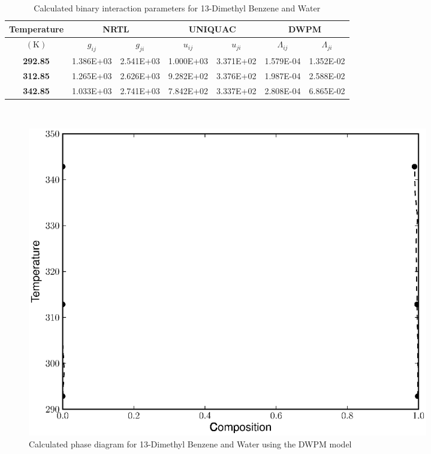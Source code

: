 \begin{table}
\begin{tabularx}{\textwidth}{c|cc|cc|cc}
\hline
\textbf{Temperature}&\multicolumn{2}{c|}{\textbf{NRTL}}&\multicolumn{2}{c|}{\textbf{UNIQUAC}}&\multicolumn{2}{c}{\textbf{DWPM}}\\
\hline
\hline 
$\left(\mathrm{K}\right)$&$g_{ij}$&$g_{ji}$&$u_{ij}$&$u_{ji}$&$\Lambda_{ij}$&$\Lambda_{ji}$\\
\hline
\textbf{ 292.85 } & 1.386E+03 & 2.541E+03 & 1.000E+03 & 3.371E+02 & 1.579E-04 & 1.352E-02\\
\textbf{ 312.85 } & 1.265E+03 & 2.626E+03 & 9.282E+02 & 3.376E+02 & 1.987E-04 & 2.588E-02\\
\textbf{ 342.85 } & 1.033E+03 & 2.741E+03 & 7.842E+02 & 3.337E+02 & 2.808E-04 & 6.865E-02\\
\hline
\end{tabularx}\\
\caption{Calculated binary interaction parameters for 13-Dimethyl Benzene and Water} \label{13DimethylBenzeneWaterTable}
\end{table}

\begin{figure}[hp]
\centering
\includegraphics[width = 0.85\textwidth]{Results_Parts/BinaryParams/13-dimethylbenzene-water/DWPM/PhaseDiagram.eps}
\caption{Calculated phase diagram for 13-Dimethyl Benzene and Water using the DWPM model} \label{DWPM13DimethylBenzeneWater}
\end{figure}

